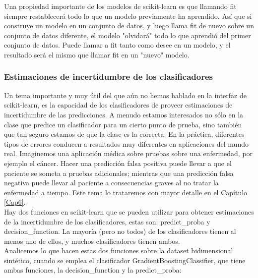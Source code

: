 {\begin{minipage}[t]{0.75\textwidth}
{		Una propiedad importante de los modelos de {\ttfamily scikit-learn} es que llamando {\ttfamily fit} siempre restablecerá todo lo que un modelo previamente ha aprendido.   Así que si construye un modelo en un conjunto de datos, y luego llama {\ttfamily fit} de nuevo sobre un conjunto de datos diferente, el modelo "{}olvidará"{}  todo lo que aprendió del primer conjunto de datos. Puede llamar a {\ttfamily fit} tanto  como desee en un modelo, y el resultado será el mismo que llamar {\ttfamily fit} en un "{}nuevo"{}  modelo.}
\end{minipage}

\subsubsection{Estimaciones de incertidumbre de los clasificadores}


Un tema importante y muy útil  del que aún no hemos hablado  en la interfaz de {\ttfamily scikit-learn}, es
la capacidad de los clasificadores de proveer estimaciones de incertidumbre de las predicciones.  A menudo estamos interesados no sólo  en la  clase que predice un clasificador para un cierto punto de prueba, sino también que tan seguro estamos de que la clase es la correcta. En la práctica, diferentes tipos de errores conducen a resultados muy diferentes en aplicaciones del mundo real. Imaginemos  una aplicación médica sobre pruebas sobre una enfermedad, por ejemplo el cáncer.  Hacer una predicción falsa positiva puede llevar a que el paciente se someta a  pruebas adicionales; mientras que una predicción falsa negativa puede llevar al paciente a consecuencias graves al no tratar la enfermedad a tiempo.  Este tema lo  trataremos  con mayor detalle en el Capítulo \ref{Cap6}.\\

 

Hay dos funciones en {\ttfamily scikit-learn} que se pueden utilizar para 
obtener estimaciones de la incertidumbre de los clasificadores, estas son:   {\ttfamily predict\_proba} y  {\ttfamily decision\_function}.   La  mayoría (pero no todos)  de los clasificadores tienen al menos uno de ellos, y muchos clasificadores tienen ambos. \\ 

Analicemos  lo que hacen estas dos funciones sobre la  dataset bidimensional sintético,  cuando se emplea 
 el  clasificador {\ttfamily GradientBoostingClassifier}, que tiene ambas funciones,  la  {\ttfamily decision\_function}  y la  {\ttfamily predict\_proba}:\\


}
